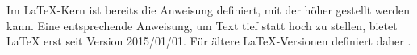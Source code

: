   \iffalse%
  \begin{Declaration}
  \end{Declaration}
  Im \LaTeX-Kern ist bereits die Anweisung
   definiert, mit der
   höher gestellt werden kann.  Eine
  entsprechende Anweisung, um Text tief statt
  hoch zu stellen, bietet
  \LaTeX{} erst seit Version
  2015/01/01. Für ältere \LaTeX-Versionen definiert \KOMAScript{} daher
  . %
  \ifthiscommonfirst
